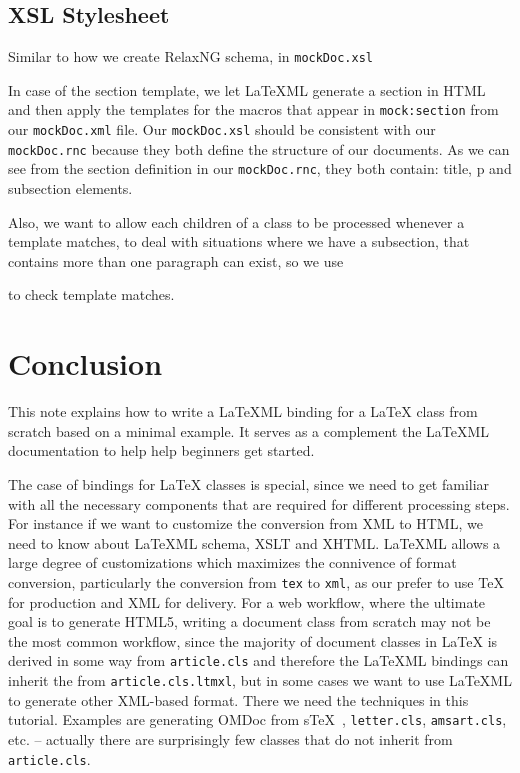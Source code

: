 \documentclass[a4paper]{article}
\def\latexml{{\LaTeX}ML\xspace}
\begin{document}
\subsection{XSL Stylesheet}
Similar to how we create RelaxNG schema, in \lstinline|mockDoc.xsl|
 

In case of the section template, we let \latexml generate a section in HTML and then apply the templates for the macros that appear in \lstinline|mock:section| from our \lstinline|mockDoc.xml| file. Our \lstinline|mockDoc.xsl| should be consistent with our \lstinline|mockDoc.rnc| because they both define the structure of our documents. As we can see from the section definition in our \lstinline|mockDoc.rnc|, they both contain: title, p and subsection elements.
 
Also, we want to allow each children of a class to be processed whenever a template matches, to deal with situations where we have a subsection, that contains more than one paragraph can exist, so we use
 
to check template matches.

\section{Conclusion}\label{sec:concl}
This note explains how to write a \latexml binding for a {\LaTeX} class from scratch based
on a minimal example. It serves as a complement the \latexml documentation to help help
beginners get started. 

The case of bindings for {\LaTeX} classes is special, since we need to get familiar with
all the necessary components that are required for different processing steps. For
instance if we want to customize the conversion from XML to HTML, we need to know about
\latexml schema, XSLT and XHTML. \latexml allows a large degree of customizations which
maximizes the connivence of format conversion, particularly the conversion from
\lstinline|tex| to \lstinline|xml|, as our prefer to use {\TeX} for production and XML for
delivery. For a web workflow, where the ultimate goal is to generate HTML5, writing a
document class from scratch may not be the most common workflow, since the majority of
document classes in {\LaTeX} is derived in some way from \lstinline|article.cls| and
therefore the \latexml bindings can inherit the from \lstinline|article.cls.ltmxl|, but in
some cases we want to use \latexml to generate other XML-based format. There we need the
techniques in this tutorial. Examples are generating OMDoc from
s\TeX~\cite{Kohlhase:ulsmf08,URL:sTeX:github}, \lstinline|letter.cls|,
\lstinline|amsart.cls|, etc. -- actually there are surprisingly few classes that do not
inherit from \lstinline|article.cls|.
\end{document}
